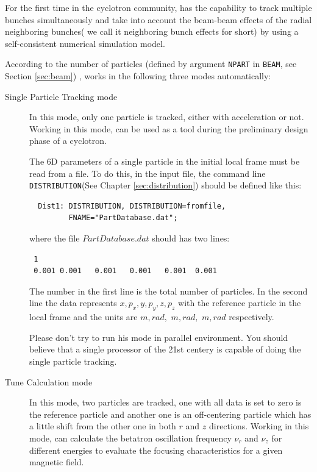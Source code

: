For the first time in the cyclotron community, \opalcycl has the capability to track multiple bunches simultaneously
and take into account the beam-beam effects of the radial neighboring bunches( we call it neighboring bunch effects for short)
by using a self-consistent numerical simulation model.

According to the number of particles (defined by argument \texttt{NPART} in \texttt{BEAM}, see Section \ref{sec:beam}) , 
\opalcycl works in the following three modes automatically:

\begin{description}

\item[Single Particle Tracking mode]

  In this mode, only one particle is tracked, either with acceleration or not.  Working in this mode, \opalcycl
  can be used as a tool during the preliminary design phase of a cyclotron.  

  The 6D parameters of a single particle in the initial local frame must be read from a file. To do this, in the \opal input file, 
  the command line \texttt{DISTRIBUTION}(See Chapter \ref{sec:distribution}) should be defined like this:
\begin{verbatim}
  Dist1: DISTRIBUTION, DISTRIBUTION=fromfile,
         FNAME="PartDatabase.dat";
\end{verbatim}
 where the file $PartDatabase.dat$ should has two lines:
\begin{verbatim}
 1
 0.001 0.001   0.001   0.001   0.001  0.001    
\end{verbatim}
The number in the first line is the total number of particles.
In the second line the data represents $x, p_x, y,$$ p_y, z, p_z$ with the reference particle 
in the local frame and the units are $m, rad,$ $ m,rad,$ $ m, rad$ respectively.

Please don't try to run his mode in parallel environment. You should believe that a single processor of the 21st centery is capable of doing
the single particle tracking.  

\item[Tune Calculation mode]

  In this mode, two particles are tracked, one with all data is set to zero is the reference particle and another one is an off-centering particle 
  which has a little shift from the other one in both $r$ and $z$ directions. Working in this mode, \opalcycl can 
  calculate the betatron oscillation frequency $\nu_r$ and $\nu_z$ for different energies to evaluate the focusing characteristics 
  for a given magnetic field.


\end{description}
